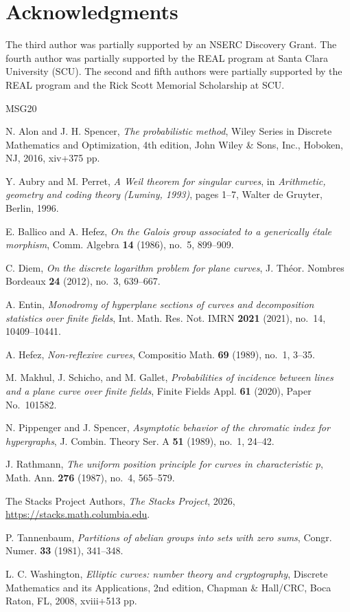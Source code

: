 \documentclass[12pt,reqno]{amsart}
\theoremstyle{definition}
\theoremstyle{remark}
\begin{document}
\section*{Acknowledgments}
The third author was partially supported by an NSERC Discovery Grant. The fourth author was partially supported by the REAL program at Santa Clara University (SCU). The second and fifth authors were partially supported by the REAL program and the Rick Scott Memorial Scholarship at SCU.

\begin{thebibliography}{MSG20}

N. Alon and J. H. Spencer, \emph{The probabilistic method}, Wiley Series in Discrete Mathematics and Optimization, 4th edition, John Wiley \& Sons, Inc., Hoboken, NJ, 2016, xiv+375 pp.

Y. Aubry and M. Perret, \emph{A {W}eil theorem for singular curves}, in \emph{Arithmetic, geometry and coding theory ({L}uminy, 1993)}, pages 1--7, Walter de Gruyter, Berlin, 1996.

E. Ballico and A. Hefez, \emph{On the Galois group associated
to a generically \'etale morphism}, Comm. Algebra
\textbf{14} (1986), no.~5, 899--909.

C. Diem, \emph{On the discrete logarithm problem for plane curves}, J. Th\'eor. Nombres Bordeaux \textbf{24} (2012), no.~3, 639--667.

A. Entin, \emph{Monodromy of hyperplane sections of curves and decomposition statistics over finite fields}, Int. Math. Res. Not. IMRN \textbf{2021} (2021), no.~14, 10409--10441.

A. Hefez, \emph{Non-reflexive curves}, Compositio Math. \textbf{69} (1989), no.~1, 3--35.

M. Makhul, J. Schicho, and M. Gallet, \emph{Probabilities of incidence between lines and a plane curve over finite fields}, Finite Fields Appl. \textbf{61} (2020), Paper No.~101582.

N. Pippenger and J. Spencer, \emph{Asymptotic behavior of the chromatic index for hypergraphs}, J. Combin. Theory Ser. A \textbf{51} (1989), no.~1, 24--42.

J. Rathmann, \emph{The uniform position principle for curves
in characteristic $p$}, Math. Ann. \textbf{276} (1987),
no.~4, 565--579.

The Stacks Project Authors, \emph{The Stacks Project},
2026, \url{https://stacks.math.columbia.edu}.

P. Tannenbaum, \emph{Partitions of abelian groups into sets with zero sums}, Congr. Numer. \textbf{33} (1981), 341--348.

L. C. Washington, \emph{Elliptic curves: number theory and cryptography}, Discrete Mathematics and its Applications, 2nd edition, Chapman \& Hall/CRC, Boca Raton, FL, 2008, xviii+513 pp.


\end{thebibliography}
\end{document}
